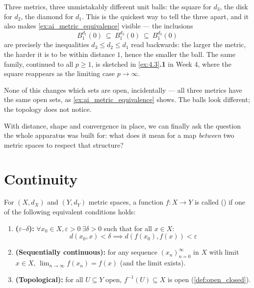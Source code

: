 \begin{remark}
\label{rem:unit_balls_distinguish_metrics}
Three metrics, three unmistakably different unit balls: the square for $d_3$, the disk for
$d_2$, the diamond for $d_1$. This is the quickest way to tell the three apart, and it also
makes \cref{ex:ai_metric_equivalence} visible --- the inclusions
\[B^{d_1}_1(0) \ \subseteq\ B^{d_2}_1(0) \ \subseteq\ B^{d_3}_1(0)\]
are precisely the inequalities $d_3 \leq d_2 \leq d_1$ read backwards: the larger the metric,
the harder it is to be within distance $1$, hence the smaller the ball. The same family,
continued to all $p \geq 1$, is sketched in \cref{ex:4.3}\textbf{.1} in Week 4, where the square
reappears as the limiting case $p \to \infty$.

None of this changes which sets are open, incidentally --- all three metrics have the same open
sets, as \cref{ex:ai_metric_equivalence} shows. The balls look different; the topology does not
notice.
\end{remark}

With distance, shape and convergence in place, we can finally ask the question the whole
apparatus was built for: what does it mean for a map \emph{between} two metric spaces to respect
that structure?

\section{Continuity}
\label{sec:continuity}

\begin{definition}
\label{def:continuous}
For $(X, d_X)$ and $(Y, d_Y)$ metric spaces, a function $f : X \to Y$ is called 
() if one of the following equivalent conditions holds:
\begin{enumerate}[label=\textbf{(\alph*)}]
  \item \textbf{($\varepsilon$--$\delta$):} $\forall x_0 \in X, \varepsilon > 0 \ \exists \delta > 0$ such that for all $x \in X$:
    \[d(x_0, x) < \delta \implies d(f(x_0), f(x)) < \varepsilon\]
  \item \textbf{(Sequentially continuous):} for any sequence $(x_n)_{n=0}^{\infty}$ in $X$ with
    limit $x \in X$, $\lim_{n\to\infty} f(x_n) = f(x)$ (and the limit exists).
  \item \textbf{(Topological):} for all $U \subseteq Y$ open, $f^{-1}(U) \subseteq X$ is open
    (\cref{def:open_closed}).
\end{enumerate}
\end{definition}

